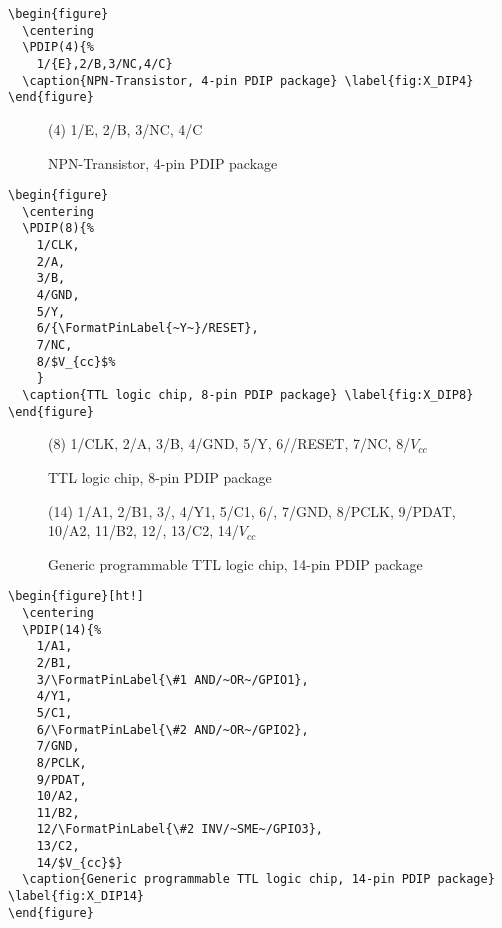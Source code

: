 \documentclass[english,a4paper,10pt]{article}
\begin{document}
\begin{lstlisting}
\begin{figure}
  \centering
  \PDIP(4){%
  	1/{E},2/B,3/NC,4/C}
  \caption{NPN-Transistor, 4-pin PDIP package} \label{fig:X_DIP4}
\end{figure}
\end{lstlisting}%

\begin{figure}[ht!]
  \centering
  \PDIP(4){%
  	1/{E},
  	2/B,
  	3/NC,
  	4/C
  	}%
  \caption{NPN-Transistor, 4-pin PDIP package} \label{fig:X_DIP4}
\end{figure}

\begin{lstlisting}
\begin{figure}
  \centering
  \PDIP(8){%
  	1/CLK,
  	2/A,
  	3/B,
  	4/GND,
  	5/Y,
  	6/{\FormatPinLabel{~Y~}/RESET},
  	7/NC,
  	8/$V_{cc}$%
  	}
  \caption{TTL logic chip, 8-pin PDIP package} \label{fig:X_DIP8}
\end{figure}
\end{lstlisting}%

\begin{figure}[ht!]
  \centering
  \PDIP(8){%
  	1/CLK,
  	2/A,
  	3/B,
  	4/GND,
  	5/Y,
  	6/{/RESET},
  	7/NC,
  	8/$V_{cc}$%
  	}
  \caption{TTL logic chip, 8-pin PDIP package} \label{fig:X_DIP8}
\end{figure}

\begin{figure}[ht!]
  \centering
  \PDIP(14){%
  	1/A1,									
  	2/B1,									
  	3/,		
  	4/Y1,									
  	5/C1,									
  	6/,		
  	7/GND,								
  	8/PCLK,								
  	9/PDAT,								
  	10/A2,								
  	11/B2,								
  	12/,	
  	13/C2,								
  	14/$V_{cc}$}							
  \caption{Generic programmable TTL logic chip, 14-pin PDIP package} \label{fig:X_DIP14}
\end{figure}

\begin{minipage}[t]{0.65\linewidth}
\begin{lstlisting}
\begin{figure}[ht!]
  \centering
  \PDIP(14){%
  	1/A1,										
  	2/B1,										
  	3/\FormatPinLabel{\#1 AND/~OR~/GPIO1},			
  	4/Y1,										
  	5/C1,										
  	6/\FormatPinLabel{\#2 AND/~OR~/GPIO2},			
  	7/GND,									
  	8/PCLK,									
  	9/PDAT,									
  	10/A2,									
  	11/B2,									
  	12/\FormatPinLabel{\#2 INV/~SME~/GPIO3},		
  	13/C2,									
  	14/$V_{cc}$}								
  \caption{Generic programmable TTL logic chip, 14-pin PDIP package} \label{fig:X_DIP14}
\end{figure}
\end{lstlisting}%
\end{minipage}\hfill
\end{document}
